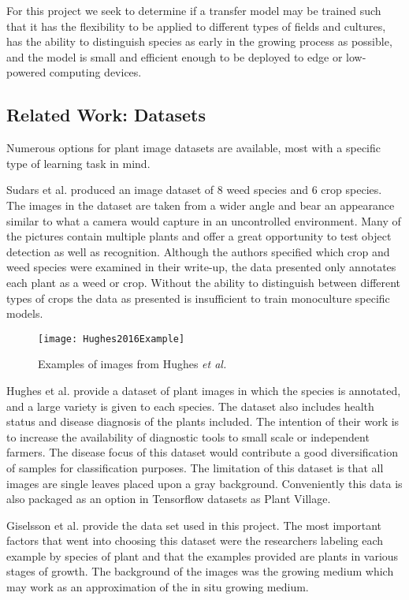 \documentclass[]{article}
\begin{document}
For this project we seek to determine if a transfer model may be trained such that 
it has the flexibility to be applied to different types of fields and cultures, 
has the ability to distinguish species as early in the growing process as possible, and the model is small and efficient enough to be deployed to edge or low-powered computing devices.

\subsection{Related Work: Datasets}

Numerous options for plant image datasets are available, most with a specific type of learning task in mind.

Sudars et al. \cite{Sudars2020} 
produced an image dataset of 8 weed species and 6 crop species. 
The images in the dataset are taken from a wider angle and bear an appearance similar to what a camera would capture in an uncontrolled environment. 
Many of the pictures contain multiple plants and offer a great opportunity to test object detection as well as recognition. 
Although the authors specified which crop and weed species were examined in their write-up, the data presented only annotates each plant as a weed or crop. 
Without the ability to distinguish between different types of crops the data as presented is insufficient to train monoculture specific models.

\begin{wrapfigure}{r}{0.4\textwidth}
	\begin{center}
		\texttt{[image: Hughes2016Example]}
	\end{center}
	\caption{Examples of images from Hughes \emph{et al.}\cite{Hughes2016}}
\end{wrapfigure}
Hughes et al. \cite{Hughes2016}
provide a dataset of plant images in which the species is annotated, and a large variety is given to each species. 
The dataset also includes health status and disease diagnosis of the plants included.
The intention of their work is to increase the availability of diagnostic tools to small scale or independent farmers.
The disease focus of this dataset would contribute a good diversification of samples for classification purposes.
The limitation of this dataset is that all images are single leaves placed upon a gray background.
Conveniently this data is also packaged as an option in Tensorflow datasets as Plant Village.

Giselsson et al. \cite{Giselsson2017}
provide the data set used in this project.
The most important factors that went into choosing this dataset were the researchers labeling each example by species of plant and that the examples provided are plants in various stages of growth. 
The background of the images was the growing medium which may work as an approximation of the in situ growing medium.
\end{document}
